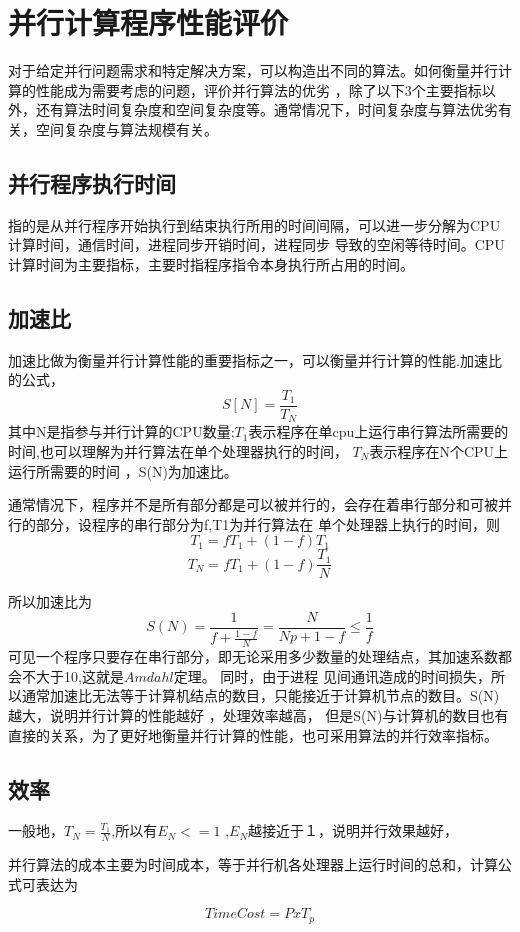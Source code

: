 \section{并行计算程序性能评价}
    对于给定并行问题需求和特定解决方案，可以构造出不同的算法。如何衡量并行计算的性能成为需要考虑的问题，评价并行算法的优劣
，除了以下3个主要指标以外，还有算法时间复杂度和空间复杂度等。通常情况下，时间复杂度与算法优劣有关，空间复杂度与算法规模有关。
\subsection{并行程序执行时间}
    指的是从并行程序开始执行到结束执行所用的时间间隔，可以进一步分解为CPU计算时间，通信时间，进程同步开销时间，进程同步
导致的空闲等待时间。CPU计算时间为主要指标，主要时指程序指令本身执行所占用的时间。    
\subsection{加速比}
加速比做为衡量并行计算性能的重要指标之一，可以衡量并行计算的性能.加速比的公式，
    \[  S[N] = \frac{T_1}{T_N}  \]
其中N是指参与并行计算的CPU数量;$T_1$表示程序在单cpu上运行串行算法所需要的时间,也可以理解为并行算法在单个处理器执行的时间，
$T_N$表示程序在N个CPU上运行所需要的时间 ，S(N)为加速比。
    
    通常情况下，程序并不是所有部分都是可以被并行的，会存在着串行部分和可被并行的部分，设程序的串行部分为f,T1为并行算法在
单个处理器上执行的时间，则
\[ T_1 = fT_1+(1-f)T_1\]
\[ T_N = fT_1+(1-f)\frac{T_1}{N}\]

    所以加速比为
    $$S(N)=\frac{1}{f+\frac{1-f}{N}} = \frac{N}{Np+1-f} \leq \frac{1}{f} $$
    可见一个程序只要存在串行部分，即无论采用多少数量的处理结点，其加速系数都会不大于10,这就是$Amdahl$定理。 同时，由于进程
见间通讯造成的时间损失，所以通常加速比无法等于计算机结点的数目，只能接近于计算机节点的数目。S(N)越大，说明并行计算的性能越好
，处理效率越高， 但是S(N)与计算机的数目也有直接的关系，为了更好地衡量并行计算的性能，也可采用算法的并行效率指标。
\subsection{效率}
一般地，$T_N = \frac{T_1}{N}$,所以有$E_N <= 1 $ ,$E_N$越接近于１，说明并行效果越好，

    并行算法的成本主要为时间成本，等于并行机各处理器上运行时间的总和，计算公式可表达为
    
    \[ TimeCost=PxT_p  \]

